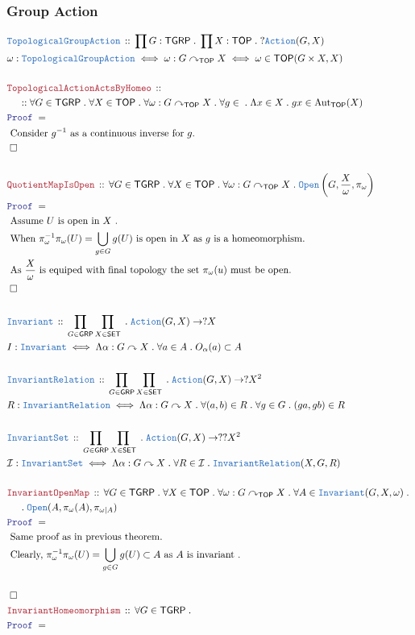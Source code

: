 \documentclass[12pt]{scrartcl}
\newcommand{\TYPE}[1]{\textcolor{NavyBlue}{\mathtt{#1}}}
\newcommand{\LOGIC}[1]{\textcolor{Blue}{\mathtt{#1}}}
\newcommand{\THM}[1]{\textcolor{Maroon}{\mathtt{#1}}}
\renewcommand{\.}{\; . \;}
\newcommand{\Theorem}[2]{& \THM{#1} \, :: \, #2 \\ & \Proof = \\ }
\newcommand{\DeclareType}[2]{& \TYPE{#1} \, :: \, #2 \\}
\newcommand{\DefineType}[3]{& #1 : \TYPE{#2} \iff #3 \\}
\newcommand{\DefineNamedType}[4]{& #1 : \TYPE{#2} \iff #3 \iff #4 \\}
\newcommand{\NewLine}{\\ & \kern 1pc}
\newcommand{\Page}[1]{ \begin{align*} #1 \end{align*}   }
\newcommand{\Explain}[1]{& \text{#1.} \\}
\newcommand{\Aut}{\mathrm{Aut}}
\newcommand{\QED}{\; \square}
\newcommand{\EndProof}{& \QED \\}
\newcommand{\Proof}{\LOGIC{Proof} \; }
\newcommand{\I}{\mathcal{I}}
\newcommand{\SET}{\mathsf{SET}}
\newcommand{\Open}{\TYPE{Open}}
\newcommand{\TOP}{\mathsf{TOP}}
\newcommand{\ActOn}{\curvearrowright}
\newcommand{\GRP}{\mathsf{GRP}}
\newcommand{\TGRP}{\mathsf{TGRP}}
\begin{document}
\subsubsection{Group Action}
\Page{
	\DeclareType{TopologicalGroupAction}
	{
		\prod G  : \TGRP \. \prod X : \TOP \. ?\TYPE{Action}(G,X)
	}
	\DefineNamedType{\omega}{TopologicalGroupAction}{\omega : G \ActOn_{\TOP} X}
	{
		 \omega \in \TOP( G \times X,  X)	
	}
	\\
	\Theorem{TopologicalActionActsByHomeo}
	{
		\NewLine ::		
		\forall G \in \TGRP \.
		\forall X \in \TOP \.
		\forall \omega : G \ActOn_{\TOP} X \.
		\forall g \in \.
		\Lambda x \in X \. gx \in \Aut_\TOP(X)
	}
	\Explain{ 
		Consider $g^{-1}$ as a continuous inverse for $g$}
	\EndProof
	\\
	\Theorem{QuotientMapIsOpen}
	{
		\forall G \in \TGRP \.
		\forall X \in \TOP \.
		\forall \omega : G \ActOn_{\TOP} X \.
		\Open\left(G, \frac{X}{\omega}, \pi_\omega \right)
	}
	\Explain{
		Assume $U$ is open in $X$
	}
	\Explain{
		When $\pi^{-1}_\omega \pi_\omega(U) = \bigcup_{g \in G} g(U)$ 
		is open in $X$ as $g$ is a homeomorphism}
	\Explain{
		As $\frac{X}{\omega}$ is equiped with final topology
		the set $\pi_\omega(u)$ must be open}
	\EndProof
	\\
	\DeclareType{Invariant}{\prod_{G \in \GRP} \prod_{X \in \SET} \. \TYPE{Action}(G,X) \to ?X } 
	\DefineType{I}{Invariant}{
		\Lambda \alpha : G \ActOn X \. 
		\forall a \in A \. O_\alpha(a) \subset A 
	}
	\\
	\DeclareType{InvariantRelation}
	{\prod_{G \in \GRP} \prod_{X \in \SET} \. \TYPE{Action}(G,X) \to ?X^2 } 
	\DefineType{R}{InvariantRelation}{
		\Lambda \alpha : G \ActOn X \.
		\forall (a,b) \in R \.
		\forall g \in G \. 
		(ga,gb) \in R }
	\\
	\DeclareType{InvariantSet}{\prod_{G \in \GRP} \prod_{X \in \SET} \. \TYPE{Action}(G,X) 
		\to ??X^2 } 
	\DefineType{\I}{InvariantSet}{
		\Lambda \alpha : G \ActOn X \. 
		\forall R \in \I \. \TYPE{InvariantRelation}(X,G,R) 
	}
	\\
	\Theorem{InvariantOpenMap}
	{
		\forall G \in \TGRP \.
		\forall X \in \TOP \.
		\forall \omega : G \ActOn_\TOP X \. 
		\forall A \in \TYPE{Invariant}(G,X,\omega) \. \NewLine \.	
		\Open(A,\pi_\omega(A),\pi_{\omega|A} )
	}
	\Explain{ 
		Same proof as in previous theorem}
	\Explain{
		Clearly, $\pi^{-1}_\omega \pi_\omega(U) = \bigcup_{g \in G} g(U) \subset A$
		as $A$ is invariant
	}
	\\
	\EndProof
	\Theorem{InvariantHomeomorphism}
	{
		\forall G \in \TGRP \.
}}
\end{document}
